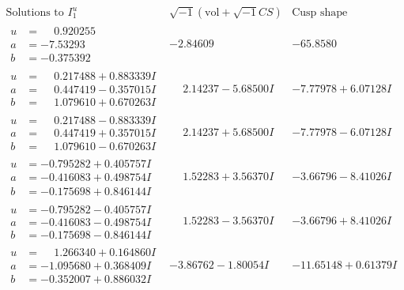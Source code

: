 \documentclass[1p]{elsarticle_modified}
\theoremstyle{definition}
\newcommand{\I}{\sqrt{-1}}
\begin{document}
$$\begin{array}{c|c|c}  
\text{Solutions to }I^u_{1}& \I (\text{vol} + \sqrt{-1}CS) & \text{Cusp shape}\\
 \hline 
\begin{aligned}
u &= \phantom{-}0.920255\phantom{ +0.000000I} \\
a &= -7.53293\phantom{ +0.000000I} \\
b &= -0.375392\phantom{ +0.000000I}\end{aligned}
 & -2.84609\phantom{ +0.000000I} & -65.8580\phantom{ +0.000000I} \\ \hline\begin{aligned}
u &= \phantom{-}0.217488 + 0.883339 I \\
a &= \phantom{-}0.447419 - 0.357015 I \\
b &= \phantom{-}1.079610 + 0.670263 I\end{aligned}
 & \phantom{-}2.14237 - 5.68500 I & -7.77978 + 6.07128 I \\ \hline\begin{aligned}
u &= \phantom{-}0.217488 - 0.883339 I \\
a &= \phantom{-}0.447419 + 0.357015 I \\
b &= \phantom{-}1.079610 - 0.670263 I\end{aligned}
 & \phantom{-}2.14237 + 5.68500 I & -7.77978 - 6.07128 I \\ \hline\begin{aligned}
u &= -0.795282 + 0.405757 I \\
a &= -0.416083 + 0.498754 I \\
b &= -0.175698 + 0.846144 I\end{aligned}
 & \phantom{-}1.52283 + 3.56370 I & -3.66796 - 8.41026 I \\ \hline\begin{aligned}
u &= -0.795282 - 0.405757 I \\
a &= -0.416083 - 0.498754 I \\
b &= -0.175698 - 0.846144 I\end{aligned}
 & \phantom{-}1.52283 - 3.56370 I & -3.66796 + 8.41026 I \\ \hline\begin{aligned}
u &= \phantom{-}1.266340 + 0.164860 I \\
a &= -1.095680 + 0.368409 I \\
b &= -0.352007 + 0.886032 I\end{aligned}
 & -3.86762 - 1.80054 I & -11.65148 + 0.61379 I \\ \hline\begin{aligned}

\end{aligned}
\end{array}$$
\end{document}
